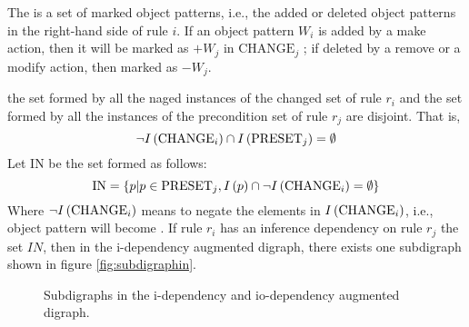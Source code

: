 \begin{defi}
The  is a set of marked object patterns, i.e., the added or deleted object patterns in the right-hand side of rule $i$. If an object pattern $W_i$ is added by a make action, then it will be marked as $+W_j$ in $\mbox{CHANGE}_j$ ; if deleted by a remove or a modify action, then marked as $-W_j$.
\cite{conf/ijcai/HsuW89}
\end{defi}

\begin{defi}
 \iffTx{} the set formed by all the naged instances of the changed set of rule $r_i$ and the set formed by all the instances of the precondition set of rule $r_j$ are disjoint. That is,
\begin{equation}
\neg I\left(\mbox{CHANGE}_i\right)\cap I\left(\mbox{PRESET}_j\right)=\emptyset
\end{equation}
Let IN be the set formed as follows:
\begin{equation}
\mbox{IN}=\left\{ p|p\in\mbox{PRESET}_j,I\left(p\right)\cap\neg I\left(\mbox{CHANGE}_i\right)=\emptyset\right\}
\end{equation}
Where $\neg I\left(\mbox{CHANGE}_i\right)$ means to negate the elements in $I\left(\mbox{CHANGE}_i\right)$, i.e.,  object pattern will become . If rule $r_i$ has an inference dependency on rule $r_j$ \wrtTx{} the set $IN$, then in the i-dependency augmented digraph, there exists one subdigraph shown in figure \ref{fig:subdigraphin}.
\cite{conf/ijcai/HsuW89}
\end{defi}

\begin{figure}[hbt]
\centering
{}
\caption{Subdigraphs in the i-dependency and io-dependency augmented digraph.}
\end{figure}


